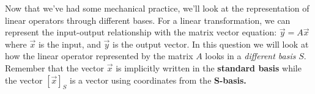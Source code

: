 \begin{enumerate}

  \end{enumerate}

  Now that we've had some mechanical practice, we'll look at the representation of linear operators through different bases. \vskip 2pt
  For a linear transformation, we can represent the input-output relationship with the matrix vector equation:
  $\vec{y} = A \vec{x}$ where $\vec{x}$ is the input, and $\vec{y}$ is the output vector. \vskip 2pt
  In this question we will look at how the linear operator represented by the matrix $A$ looks in a \textit{different basis} $S.$ \vskip 2pt
  Remember that the vector $\vec{x}$ is implicitly written in the \textbf{standard basis} while the vector $[\vec{x}]_S$ is a vector using coordinates from the \textbf{S-basis.}

